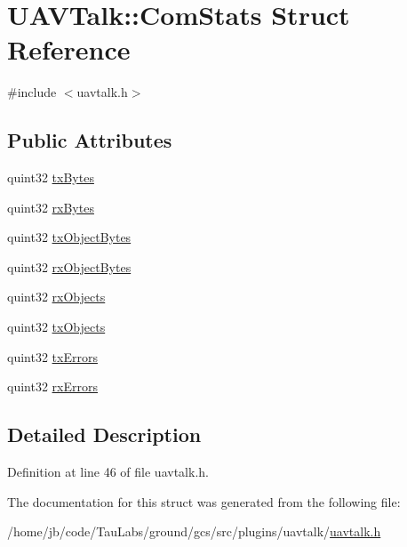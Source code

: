 \hypertarget{struct_u_a_v_talk_1_1_com_stats}{\section{\-U\-A\-V\-Talk\-:\-:\-Com\-Stats \-Struct \-Reference}
\label{struct_u_a_v_talk_1_1_com_stats}
}


{\ttfamily \#include $<$uavtalk.\-h$>$}

\subsection*{\-Public \-Attributes}
\begin{DoxyCompactItemize}
\item 
quint32 \hyperlink{group___u_a_v_talk_plugin_ga6ab32543081346e61bdc67874617d3e1}{tx\-Bytes}
\item 
quint32 \hyperlink{group___u_a_v_talk_plugin_ga93a6f8b7f60333a7e7afb70085ca7efd}{rx\-Bytes}
\item 
quint32 \hyperlink{group___u_a_v_talk_plugin_gaf811665cd1c815ac65764deff354ba6c}{tx\-Object\-Bytes}
\item 
quint32 \hyperlink{group___u_a_v_talk_plugin_ga6a61f515e2c09de8fadddb1d8382a2a1}{rx\-Object\-Bytes}
\item 
quint32 \hyperlink{group___u_a_v_talk_plugin_ga60c07de32f4130a7b761066819bf0712}{rx\-Objects}
\item 
quint32 \hyperlink{group___u_a_v_talk_plugin_ga4d48878de025a87f65263e537467fb9b}{tx\-Objects}
\item 
quint32 \hyperlink{group___u_a_v_talk_plugin_gaddc2324ebd5b83b73e1f873131efcccf}{tx\-Errors}
\item 
quint32 \hyperlink{group___u_a_v_talk_plugin_ga52c1d5163810f507e6ca052884ee7ecc}{rx\-Errors}
\end{DoxyCompactItemize}


\subsection{\-Detailed \-Description}


\-Definition at line 46 of file uavtalk.\-h.



\-The documentation for this struct was generated from the following file\-:\begin{DoxyCompactItemize}
\item 
/home/jb/code/\-Tau\-Labs/ground/gcs/src/plugins/uavtalk/\hyperlink{uavtalk_8h}{uavtalk.\-h}\end{DoxyCompactItemize}
